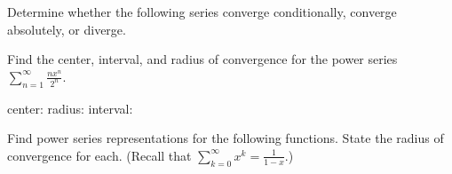 \documentclass[addpoints,12pt]{exam}
\newcommand {\ds}{\displaystyle}
\begin{document}
\begin{questions}

\question Determine whether the following series converge
  conditionally, converge absolutely, or diverge.

\question[6] Find the center, interval, and radius of convergence for
  the power series $\ds \sum_{n=1}^{\infty} \frac{nx^n}{2^n}$.
  \vfill
  
  center:\underline{\hspace{3cm}} \hfill radius:\underline{\hspace{3cm}} \hfill interval:\underline{\hspace{3cm}}

  \newpage
  
\question Find power series representations for the following
  functions. State the
  radius of convergence for each. (Recall that $\ds
  \sum_{k=0}^{\infty} x^k = \frac{1}{1-x}$.)
  \begin{parts}

\end{parts}
\end{questions}
\end{document}
